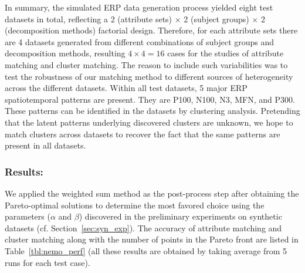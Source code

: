 In summary, the simulated ERP data generation process yielded eight test datasets in total, reflecting a 2 (attribute sets) $\times$ 2 (subject groups) $\times$ 2 (decomposition methods) factorial design. Therefore, for each attribute sets there are 4 datasets generated from different combinations of subject groups and decomposition methods, resulting $4 \times 4 = 16$ cases for the studies of attribute matching and cluster matching. The reason to include such variabilities was to test the robustness of our matching method to different sources of heterogeneity across the different datasets. Within all test datasets, 5 major ERP spatiotemporal patterns are present. They are P100, N100, N3, MFN, and P300. These patterns can be identified in the datasets by clustering analysis. Pretending that the latent patterns underlying discovered clusters are unknown, we hope to match clusters across datasets to recover the fact that the same patterns are present in all datasets.

\subsubsection{Results:}
We applied the weighted sum method as the post-process step after obtaining the Pareto-optimal solutions to determine the most favored choice using the parameters ($\alpha$ and $\beta$) discovered in the preliminary experiments on synthetic datasets (cf. Section~\ref{sec:syn_exp}). The accuracy of attribute matching and cluster matching along with the number of points in the Pareto front are listed in Table~\ref{tbl:nemo_perf} (all these results are obtained by taking average from 5 runs for each test case).


